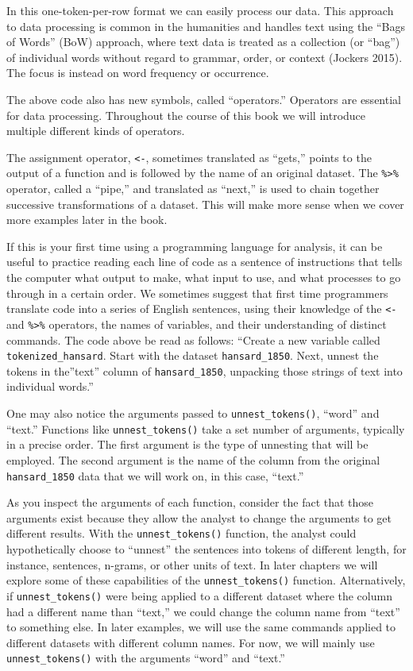 \documentclass[
]{article}
\newcounter{chapter}
\begin{document}
In this one-token-per-row format we can easily process our data. This
approach to data processing is common in the humanities and handles text
using the ``Bags of Words'' (BoW) approach, where text data is treated
as a collection (or ``bag'') of individual words without regard to
grammar, order, or context (Jockers 2015). The focus is instead on word
frequency or occurrence.

The above code also has new symbols, called ``operators.'' Operators are
essential for data processing. Throughout the course of this book we
will introduce multiple different kinds of operators.

The assignment operator, \texttt{\textless{}-}, sometimes translated as
``gets,'' points to the output of a function and is followed by the name
of an original dataset. The \texttt{\%\textgreater{}\%} operator, called
a ``pipe,'' and translated as ``next,'' is used to chain together
successive transformations of a dataset. This will make more sense when
we cover more examples later in the book.

If this is your first time using a programming language for analysis, it
can be useful to practice reading each line of code as a sentence of
instructions that tells the computer what output to make, what input to
use, and what processes to go through in a certain order. We sometimes
suggest that first time programmers translate code into a series of
English sentences, using their knowledge of the \texttt{\textless{}-}
and \texttt{\%\textgreater{}\%} operators, the names of variables, and
their understanding of distinct commands. The code above be read as
follows: ``Create a new variable called \texttt{tokenized\_hansard}.
Start with the dataset \texttt{hansard\_1850}. Next, unnest the tokens
in the''text'' column of \texttt{hansard\_1850}, unpacking those strings
of text into individual words.''

One may also notice the arguments passed to \texttt{unnest\_tokens()},
``word'' and ``text.'' Functions like \texttt{unnest\_tokens()} take a
set number of arguments, typically in a precise order. The first
argument is the type of unnesting that will be employed. The second
argument is the name of the column from the original
\texttt{hansard\_1850} data that we will work on, in this case,
``text.''

As you inspect the arguments of each function, consider the fact that
those arguments exist because they allow the analyst to change the
arguments to get different results. With the \texttt{unnest\_tokens()}
function, the analyst could hypothetically choose to ``unnest'' the
sentences into tokens of different length, for instance, sentences,
n-grams, or other units of text. In later chapters we will explore some
of these capabilities of the \texttt{unnest\_tokens()} function.
Alternatively, if \texttt{unnest\_tokens()} were being applied to a
different dataset where the column had a different name than ``text,''
we could change the column name from ``text'' to something else. In
later examples, we will use the same commands applied to different
datasets with different column names. For now, we will mainly use
\texttt{unnest\_tokens()} with the arguments ``word'' and ``text.''
\end{document}
